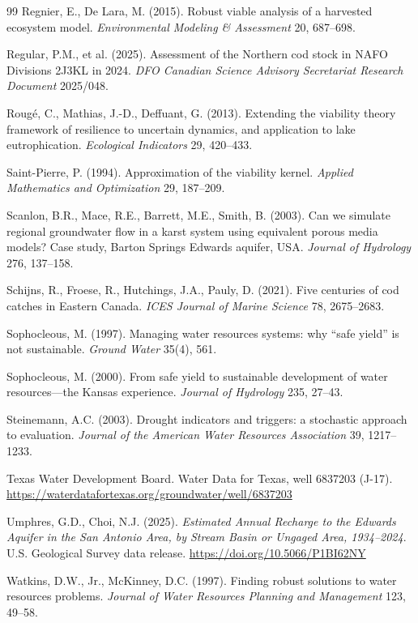 \documentclass[11pt,a4paper]{article}
\theoremstyle{plain}
\theoremstyle{definition}
\theoremstyle{remark}
\begin{document}
\begin{thebibliography}{99}
 Regnier, E., De Lara, M. (2015). Robust viable analysis of a harvested ecosystem model. \emph{Environmental Modeling \& Assessment} 20, 687--698.

 Regular, P.M., et al. (2025). Assessment of the Northern cod stock in NAFO Divisions 2J3KL in 2024. \emph{DFO Canadian Science Advisory Secretariat Research Document} 2025/048.

 Roug\'e, C., Mathias, J.-D., Deffuant, G. (2013). Extending the viability theory framework of resilience to uncertain dynamics, and application to lake eutrophication. \emph{Ecological Indicators} 29, 420--433.

 Saint-Pierre, P. (1994). Approximation of the viability kernel. \emph{Applied Mathematics and Optimization} 29, 187--209.

 Scanlon, B.R., Mace, R.E., Barrett, M.E., Smith, B. (2003). Can we simulate regional groundwater flow in a karst system using equivalent porous media models? Case study, Barton Springs Edwards aquifer, USA. \emph{Journal of Hydrology} 276, 137--158.

 Schijns, R., Froese, R., Hutchings, J.A., Pauly, D. (2021). Five centuries of cod catches in Eastern Canada. \emph{ICES Journal of Marine Science} 78, 2675--2683.

 Sophocleous, M. (1997). Managing water resources systems: why ``safe yield'' is not sustainable. \emph{Ground Water} 35(4), 561.

 Sophocleous, M. (2000). From safe yield to sustainable development of water resources---the Kansas experience. \emph{Journal of Hydrology} 235, 27--43.

 Steinemann, A.C. (2003). Drought indicators and triggers: a stochastic approach to evaluation. \emph{Journal of the American Water Resources Association} 39, 1217--1233.

 Texas Water Development Board. Water Data for Texas, well 6837203 (J-17). \url{https://waterdatafortexas.org/groundwater/well/6837203}

 Umphres, G.D., Choi, N.J. (2025). \emph{Estimated Annual Recharge to the Edwards Aquifer in the San Antonio Area, by Stream Basin or Ungaged Area, 1934--2024}. U.S. Geological Survey data release. \url{https://doi.org/10.5066/P1BI62NY}

 Watkins, D.W., Jr., McKinney, D.C. (1997). Finding robust solutions to water resources problems. \emph{Journal of Water Resources Planning and Management} 123, 49--58.

\end{thebibliography}
\end{document}
